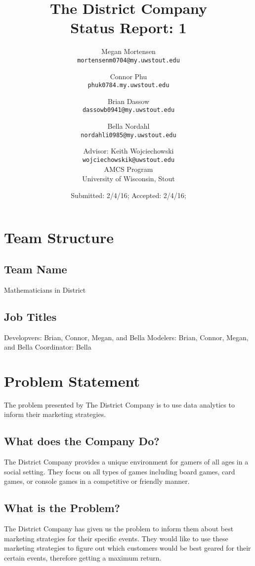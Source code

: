 \documentclass[11pt]{report}
\title{The District Company \\ Status Report: 1}
\author{
Megan Mortensen\\
\small \texttt{mortensenm0704@my.uwstout.edu}
\and
Connor Phu\\
\small \texttt{phuk0784.my.uwstout.edu}
\and
Brian Dassow\\
\small \texttt{dassowb0941@my.uwstout.edu}
\and
Bella Nordahl\\
\small \texttt{nordahli0985@my.uwstout.edu}
\and
Advisor: Keith Wojciechowski\\
\small \texttt{wojciechowskik@uwstout.edu}\\
\bigskip
AMCS Program\\
University of Wisconsin, Stout
}
\date{\small Submitted: 2/4/16;  Accepted: 2/4/16;}
\begin{document}
\maketitle

\section*{\hspace{-.5cm} Team Structure}

\subsection*{\hspace{-.5cm} Team Name}
Mathematicians in District

\subsection*{\hspace{-.5cm} Job Titles}
Developvers: Brian, Connor, Megan, and Bella
\newline
Modelers: Brian, Connor, Megan, and Bella
\newline
Coordinator: Bella

\section*{\hspace{-.5cm} Problem Statement}\label{intro}
The problem presented by The District Company is to use data analytics to inform
their marketing strategies.

\subsection*{\hspace{-.5cm} What does the Company Do?}\label{overview}
The District Company provides a unique environment for gamers of all ages in a
social setting.  They focus on all types of games including board games, card
games, or console games in a competitive or friendly manner.


\subsection*{\hspace{-.5cm} What is the Problem?}\label{tech}
The District Company has given us the problem to inform them about best
marketing strategies for their specific events.  They would like to use these
marketing strategies to figure out which customers would be best geared for
their certain events, therefore getting a maximum return.
\end{document}
